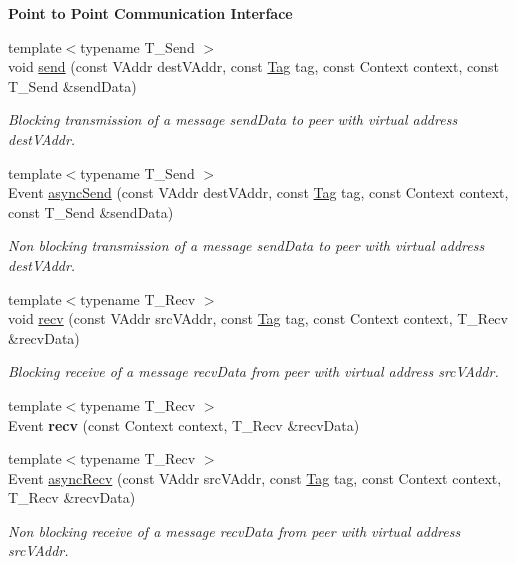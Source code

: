 \begin{Indent}{\bf Point to Point Communication Interface}\par
\begin{DoxyCompactItemize}
\item 
{\footnotesize template$<$typename T\+\_\+\+Send $>$ }\\void \hyperlink{structgraybat_1_1communicationPolicy_1_1BMPI_a798111a6407368dc1b33b9893d9d1330}{send} (const V\+Addr dest\+V\+Addr, const \hyperlink{structTag}{Tag} tag, const Context context, const T\+\_\+\+Send \&send\+Data)
\begin{DoxyCompactList}\small\item\em Blocking transmission of a message send\+Data to peer with virtual address dest\+V\+Addr. \end{DoxyCompactList}\item 
{\footnotesize template$<$typename T\+\_\+\+Send $>$ }\\Event \hyperlink{structgraybat_1_1communicationPolicy_1_1BMPI_a68444513404ebd1548f34cbf3a2c3cc2}{async\+Send} (const V\+Addr dest\+V\+Addr, const \hyperlink{structTag}{Tag} tag, const Context context, const T\+\_\+\+Send \&send\+Data)
\begin{DoxyCompactList}\small\item\em Non blocking transmission of a message send\+Data to peer with virtual address dest\+V\+Addr. \end{DoxyCompactList}\item 
{\footnotesize template$<$typename T\+\_\+\+Recv $>$ }\\void \hyperlink{structgraybat_1_1communicationPolicy_1_1BMPI_a4201b53dcff9d3acef8724031d93a8fd}{recv} (const V\+Addr src\+V\+Addr, const \hyperlink{structTag}{Tag} tag, const Context context, T\+\_\+\+Recv \&recv\+Data)
\begin{DoxyCompactList}\small\item\em Blocking receive of a message recv\+Data from peer with virtual address src\+V\+Addr. \end{DoxyCompactList}\item 
\hypertarget{structgraybat_1_1communicationPolicy_1_1BMPI_a9b8346f1fab44e4160819a352f264884}{}{\footnotesize template$<$typename T\+\_\+\+Recv $>$ }\\Event {\bfseries recv} (const Context context, T\+\_\+\+Recv \&recv\+Data)\label{structgraybat_1_1communicationPolicy_1_1BMPI_a9b8346f1fab44e4160819a352f264884}

\item 
{\footnotesize template$<$typename T\+\_\+\+Recv $>$ }\\Event \hyperlink{structgraybat_1_1communicationPolicy_1_1BMPI_a092b709e200b44cacf32909e9dace56b}{async\+Recv} (const V\+Addr src\+V\+Addr, const \hyperlink{structTag}{Tag} tag, const Context context, T\+\_\+\+Recv \&recv\+Data)
\begin{DoxyCompactList}\small\item\em Non blocking receive of a message recv\+Data from peer with virtual address src\+V\+Addr. \end{DoxyCompactList}\end{DoxyCompactItemize}
\end{Indent}

